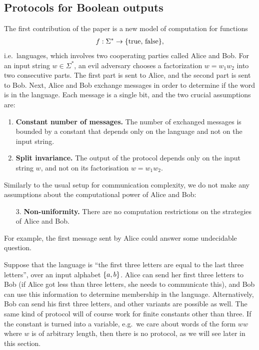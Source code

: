 \subsection{Protocols for Boolean outputs}
\label{sec:intro-boolean}
The first contribution of the paper is a new model of computation for functions
\begin{align*}
f : \Sigma^* \to \{\text{true, false}\},
\end{align*}
i.e.~languages, which involves two  cooperating parties called Alice and Bob. For an input string $w \in \Sigma^*$, an evil adversary chooses a factorization $w = w_1 w_2$  into two consecutive parts. The first part is sent to Alice, and the second part is sent to Bob. Next, Alice and Bob exchange messages  in order to determine if the word is in the language. Each message is a single bit, and the two crucial assumptions are:
\begin{enumerate}
  \item \textbf{Constant  number of messages.} The number of exchanged messages is bounded by a constant  that depends only on the language and not on the input string.
  \item \textbf{Split invariance.} The output of the protocol depends only on the input string $w$, and not on its factorisation $w=w_1 w_2$.
\end{enumerate}
Similarly to the usual setup for communication complexity,  we do not make any assumptions about the computational power of Alice and Bob:
\begin{enumerate}
    \item[3.] \textbf{Non-uniformity.} There are no computation restrictions on the strategies of Alice and Bob.
\end{enumerate}
For example, the first message sent by Alice could answer  some undecidable question.

\begin{myexample}
    \label{ex:three-letters}
Suppose that the language is ``the first three letters are equal to the last three letters'', over an input alphabet $\{a,b\}$.
Alice can send her  first three letters to Bob (if Alice got less than three letters, she needs to communicate this), and Bob can use this information to determine membership in the language. Alternatively, Bob can send his first three letters, and other variants are possible as well. The same kind of  protocol will of course work for finite constants other than three. If the constant is turned into a variable, e.g.~we care about words of the form $ww$ where $w$ is of arbitrary length, then there is no  protocol, as we will see later in this section. 
\end{myexample}

